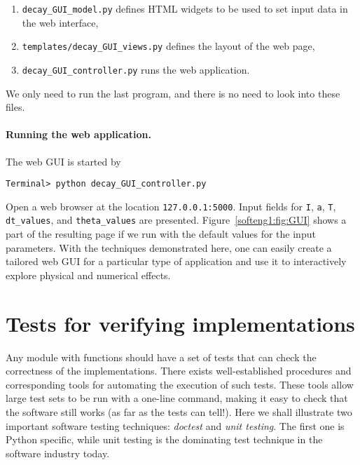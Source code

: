 \documentclass[graybox,sectrefs,envcountresetchap,open=right,final]{svmonodo}
\begin{document}
\begin{enumerate}
 \item \Verb!decay_GUI_model.py! defines HTML widgets to be used to set
    input data in the web interface,

 \item \Verb!templates/decay_GUI_views.py! defines the layout of the web page,

 \item \Verb!decay_GUI_controller.py! runs the web application.
\end{enumerate}

\noindent
We only need to run the last program, and there is no need to look into
these files.

\paragraph{Running the web application.}
The web GUI is started by

\begin{Verbatim}[frame=lines,label=\fbox{{\tiny Terminal}},framesep=2.5mm,framerule=0.7pt,fontsize=\fontsize{9pt}{9pt}]
Terminal> python decay_GUI_controller.py
\end{Verbatim}
Open a web browser at the location \texttt{127.0.0.1:5000}. Input fields for
\texttt{I}, \texttt{a}, \texttt{T}, \Verb!dt_values!, and \Verb!theta_values! are presented.  Figure~\ref{softeng1:fig:GUI} shows a part of the resulting page if we run
with the default values for the input parameters.
With the techniques demonstrated here, one can
easily create a tailored web GUI for a particular type of application
and use it to interactively explore physical and numerical effects.

\section{Tests for verifying implementations}

Any module with functions should have a set of tests that can
check the
correctness of the implementations.
There exists
well-established procedures and corresponding tools for automating
the execution of such tests. These tools allow large test sets to be
run with a one-line command, making it easy to check that the
software still works (as far as the
tests can tell!). Here we shall illustrate two important
software testing techniques: \emph{doctest} and \emph{unit testing}.
The first one is Python specific, while unit testing is the dominating
test technique in the software industry today.
\end{document}
